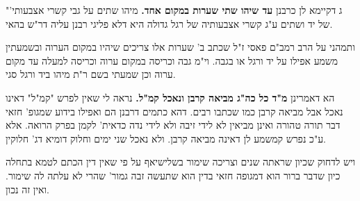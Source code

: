 \documentclass[12pt, openany]{book}
\newcommand{\sethebfont}{
\fontsize{10.5pt}{21.0pt} \selectfont
}
\newcommand{\twocol}[1]{
	{\sethebfont \begin{multicols}{2}
			#1
	\end{multicols}}	
}
\newcommand{\textblock}[1]{
{\sethebfont #1\\}	
}
\begin{document}
{"ג דקיימא לן כרבנן \textbf{עד שיהו שתי שערות במקום אחד.}  מיהו שתים על גבי קשרי אצבעותי' של יד ושתים ע"ג קשרי אצבעותיה של רגל גדולה היא דלא פליגי רבנן עליה דר"ש בהאי.\par ותמהני על הרב רמב"ם פאסי ז"ל שכתב ב' שערות אלו צריכים שיהיו במקום הערוה ובשמעתין משמע אפילו על יד ורגל או בגבה. וי"מ גבה וכריסה במקום ערוה וכריסה למעלה עד מקום ערוה וכן שמעתי בשם ר"ת מיהו ביד ורגל סגי. 
\par}
\twocol{ הא דאמרינן \textbf{מ"ד כל כה"ג מביאה קרבן ונאכל קמ"ל.}  נראה לי שאין לפרש "קמ"ל" דאינו נאכל אבל מביאה קרבן כמו שכתבו רבים. דהא כתמים דרבנן הם ואפילו בידוע שמגופ' חזאי דבר תורה טהורה ואינן מביאין לא לידי זיבה ולא לידי נדה כדאית' לקמן בפרק הרואה. אלא ע"כ נפרש קמשמע לן דאינה מביאה קרבן. ולא נאכל שני ימים וחלוק דומיא דג' חלוקין.\par  ויש לדחוק שכיון שראתה שנים וצריכה שימור בשלישיאף על פי שאין דין הכתם לטמא בתחלה כיון שדבר ברור הוא דמגופה חזאי בדין הוא שתעשה זבה גמור' שהרי לא עלתה לה שימור. ואין זה נכון. 
\par}
\textblock{}{}
\end{document}
